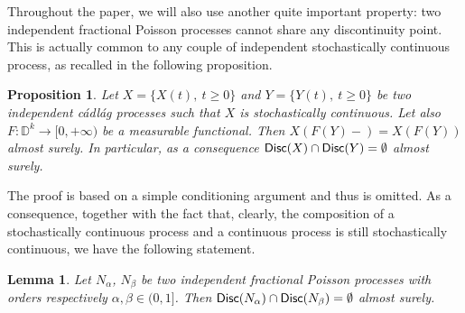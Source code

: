 \documentclass[]{amsart}
\numberwithin{equation}{section}
\newtheorem{prop}[thm]{Proposition}
\newtheorem{lem}[thm]{Lemma}
\theoremstyle{remark}
\newtheorem{rmk}[thm]{Remark}
\theoremstyle{definition}
\DeclareMathOperator{\bP}{\mathbb{P}}
\begin{document}
Throughout the paper, we will also use another quite important property: two independent fractional Poisson processes cannot share any discontinuity point. This is actually common to any couple of independent stochastically continuous process, as recalled in the following proposition.
\begin{prop}\label{prop:noshareddisc}
	Let $X=\{X(t), \ t \ge 0\}$ and $Y=\{Y(t), \ t \ge 0\}$ be two independent c\'adl\'ag processes such that $X$ is stochastically continuous.
	Let also $F:\mathbb{D}^k \to [0,+\infty)$ be a measurable functional. Then $X(F(Y)-)=X(F(Y))$ almost surely.
	In particular, as a consequence ${\sf Disc}(X) \cap {\sf Disc}(Y)=\emptyset$ almost surely.
\end{prop}
The proof is based on a simple conditioning argument and thus is omitted. 
As a consequence, together with the fact that, clearly, the composition of a stochastically continuous process and a continuous process is still stochastically continuous, we have the following statement.
\begin{lem}\label{lem:nonsim}
	Let $N_\alpha$, $N_\beta$ be two independent fractional Poisson processes with orders respectively $\alpha,\beta \in (0,1]$. Then ${\sf Disc}(N_\alpha)\cap {\sf Disc}(N_\beta)=\emptyset$ almost surely. 
\end{lem}
\end{document}
